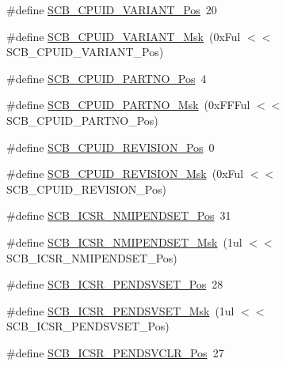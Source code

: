 \begin{DoxyCompactItemize}
\item 
\#define \hyperlink{group___c_m_s_i_s___c_m3___s_c_b_ga104462bd0815391b4044a70bd15d3a71}{S\-C\-B\-\_\-\-C\-P\-U\-I\-D\-\_\-\-V\-A\-R\-I\-A\-N\-T\-\_\-\-Pos}~20
\item 
\#define \hyperlink{group___c_m_s_i_s___c_m3___s_c_b_gad358dfbd04300afc1824329d128b99e8}{S\-C\-B\-\_\-\-C\-P\-U\-I\-D\-\_\-\-V\-A\-R\-I\-A\-N\-T\-\_\-\-Msk}~(0x\-Ful $<$$<$ S\-C\-B\-\_\-\-C\-P\-U\-I\-D\-\_\-\-V\-A\-R\-I\-A\-N\-T\-\_\-\-Pos)
\item 
\#define \hyperlink{group___c_m_s_i_s___c_m3___s_c_b_ga705f68eaa9afb042ca2407dc4e4629ac}{S\-C\-B\-\_\-\-C\-P\-U\-I\-D\-\_\-\-P\-A\-R\-T\-N\-O\-\_\-\-Pos}~4
\item 
\#define \hyperlink{group___c_m_s_i_s___c_m3___s_c_b_ga98e581423ca016680c238c469aba546d}{S\-C\-B\-\_\-\-C\-P\-U\-I\-D\-\_\-\-P\-A\-R\-T\-N\-O\-\_\-\-Msk}~(0x\-F\-F\-Ful $<$$<$ S\-C\-B\-\_\-\-C\-P\-U\-I\-D\-\_\-\-P\-A\-R\-T\-N\-O\-\_\-\-Pos)
\item 
\#define \hyperlink{group___c_m_s_i_s___c_m3___s_c_b_ga3c3d9071e574de11fb27ba57034838b1}{S\-C\-B\-\_\-\-C\-P\-U\-I\-D\-\_\-\-R\-E\-V\-I\-S\-I\-O\-N\-\_\-\-Pos}~0
\item 
\#define \hyperlink{group___c_m_s_i_s___c_m3___s_c_b_ga2ec0448b6483f77e7f5d08b4b81d85df}{S\-C\-B\-\_\-\-C\-P\-U\-I\-D\-\_\-\-R\-E\-V\-I\-S\-I\-O\-N\-\_\-\-Msk}~(0x\-Ful $<$$<$ S\-C\-B\-\_\-\-C\-P\-U\-I\-D\-\_\-\-R\-E\-V\-I\-S\-I\-O\-N\-\_\-\-Pos)
\item 
\#define \hyperlink{group___c_m_s_i_s___c_m3___s_c_b_ga750d4b52624a46d71356db4ea769573b}{S\-C\-B\-\_\-\-I\-C\-S\-R\-\_\-\-N\-M\-I\-P\-E\-N\-D\-S\-E\-T\-\_\-\-Pos}~31
\item 
\#define \hyperlink{group___c_m_s_i_s___c_m3___s_c_b_ga340e3f79e9c3607dee9f2c048b6b22e8}{S\-C\-B\-\_\-\-I\-C\-S\-R\-\_\-\-N\-M\-I\-P\-E\-N\-D\-S\-E\-T\-\_\-\-Msk}~(1ul $<$$<$ S\-C\-B\-\_\-\-I\-C\-S\-R\-\_\-\-N\-M\-I\-P\-E\-N\-D\-S\-E\-T\-\_\-\-Pos)
\item 
\#define \hyperlink{group___c_m_s_i_s___c_m3___s_c_b_gab5ded23d2ab1d5ff7cc7ce746205e9fe}{S\-C\-B\-\_\-\-I\-C\-S\-R\-\_\-\-P\-E\-N\-D\-S\-V\-S\-E\-T\-\_\-\-Pos}~28
\item 
\#define \hyperlink{group___c_m_s_i_s___c_m3___s_c_b_ga1e40d93efb402763c8c00ddcc56724ff}{S\-C\-B\-\_\-\-I\-C\-S\-R\-\_\-\-P\-E\-N\-D\-S\-V\-S\-E\-T\-\_\-\-Msk}~(1ul $<$$<$ S\-C\-B\-\_\-\-I\-C\-S\-R\-\_\-\-P\-E\-N\-D\-S\-V\-S\-E\-T\-\_\-\-Pos)
\item 
\#define \hyperlink{group___c_m_s_i_s___c_m3___s_c_b_gae218d9022288f89faf57187c4d542ecd}{S\-C\-B\-\_\-\-I\-C\-S\-R\-\_\-\-P\-E\-N\-D\-S\-V\-C\-L\-R\-\_\-\-Pos}~27
$$
\end{DoxyCompactItemize}
